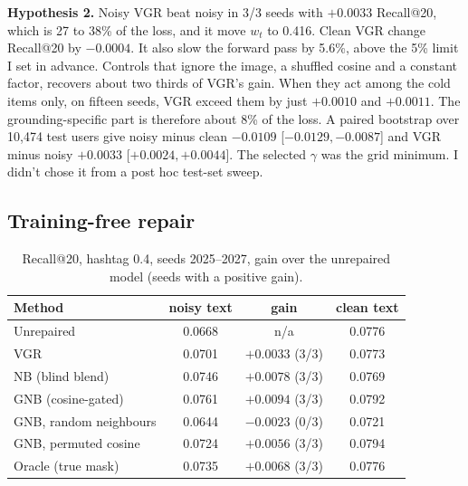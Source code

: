 \documentclass[conference]{IEEEtran}
\begin{document}
\textbf{Hypothesis 2.} Noisy VGR beat noisy in 3/3 seeds with $+0.0033$ Recall@20, which is 27 to 38\% of the loss, and it move $w_t$ to 0.416. Clean VGR change Recall@20 by $-0.0004$. It also slow the forward pass by 5.6\%, above the 5\% limit I set in advance. Controls that ignore the image, a shuffled cosine and a constant factor, recovers about two thirds of VGR's gain. When they act among the cold items only, on fifteen seeds, VGR exceed them by just $+0.0010$ and $+0.0011$. The grounding-specific part is therefore about 8\% of the loss. A paired bootstrap over 10,474 test users give noisy minus clean $-0.0109$ [$-0.0129,-0.0087$] and VGR minus noisy $+0.0033$ [$+0.0024,+0.0044$]. The selected $\gamma$ was the grid minimum. I didn't chose it from a post hoc test-set sweep.

\subsection{Training-free repair}

\begin{table}[!htb]
\centering\caption{Recall@20, hashtag 0.4, seeds 2025--2027, gain over the unrepaired model (seeds with a positive gain).}
\label{tab:repair}
\small\setlength{\tabcolsep}{3pt}
\begin{tabular}{@{}>{\raggedright\arraybackslash}p{3.3cm}ccc@{}}
\hline
Method & noisy text & gain & clean text \\
\hline
Unrepaired & 0.0668 & n/a & 0.0776 \\
VGR & 0.0701 & $+0.0033$ (3/3) & 0.0773 \\
NB (blind blend) & 0.0746 & $+0.0078$ (3/3) & 0.0769 \\
GNB (cosine-gated) & 0.0761 & $+0.0094$ (3/3) & 0.0792 \\
GNB, random neighbours & 0.0644 & $-0.0023$ (0/3) & 0.0721 \\
GNB, permuted cosine & 0.0724 & $+0.0056$ (3/3) & 0.0794 \\
Oracle (true mask) & 0.0735 & $+0.0068$ (3/3) & 0.0776 \\
\hline
\end{tabular}
\end{table}
\end{document}
